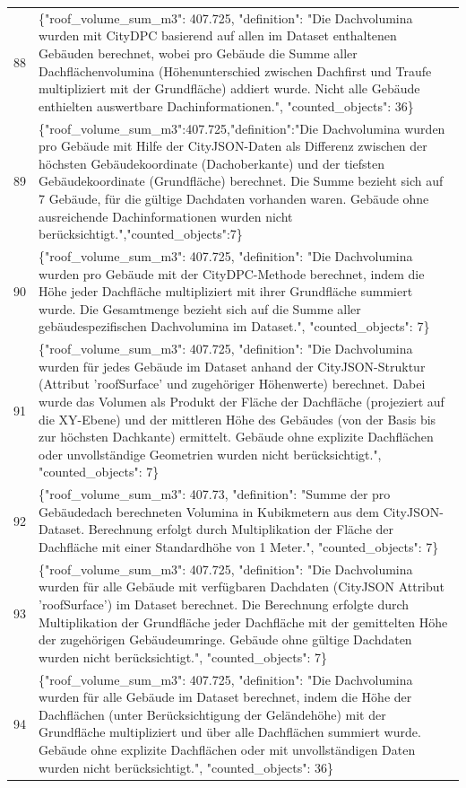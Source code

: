 \documentclass[a4paper,11pt]{article}
\begin{document}
\begin{table}[ht]
\begin{tabular}{r p{12cm}}
88 & \{"roof\_volume\_sum\_m3": 407.725, "definition": "Die Dachvolumina wurden mit CityDPC basierend auf allen im Dataset enthaltenen Gebäuden berechnet, wobei pro Gebäude die Summe aller Dachflächenvolumina (Höhenunterschied zwischen Dachfirst und Traufe multipliziert mit der Grundfläche) addiert wurde. Nicht alle Gebäude enthielten auswertbare Dachinformationen.", "counted\_objects": 36\} \\
89 & \{"roof\_volume\_sum\_m3":407.725,"definition":"Die Dachvolumina wurden pro Gebäude mit Hilfe der CityJSON-Daten als Differenz zwischen der höchsten Gebäudekoordinate (Dachoberkante) und der tiefsten Gebäudekoordinate (Grundfläche) berechnet. Die Summe bezieht sich auf 7 Gebäude, für die gültige Dachdaten vorhanden waren. Gebäude ohne ausreichende Dachinformationen wurden nicht berücksichtigt.","counted\_objects":7\} \\
90 & \{"roof\_volume\_sum\_m3": 407.725, "definition": "Die Dachvolumina wurden pro Gebäude mit der CityDPC-Methode berechnet, indem die Höhe jeder Dachfläche multipliziert mit ihrer Grundfläche summiert wurde. Die Gesamtmenge bezieht sich auf die Summe aller gebäudespezifischen Dachvolumina im Dataset.", "counted\_objects": 7\} \\
91 & \{"roof\_volume\_sum\_m3": 407.725, "definition": "Die Dachvolumina wurden für jedes Gebäude im Dataset anhand der CityJSON-Struktur (Attribut 'roofSurface' und zugehöriger Höhenwerte) berechnet. Dabei wurde das Volumen als Produkt der Fläche der Dachfläche (projeziert auf die XY-Ebene) und der mittleren Höhe des Gebäudes (von der Basis bis zur höchsten Dachkante) ermittelt. Gebäude ohne explizite Dachflächen oder unvollständige Geometrien wurden nicht berücksichtigt.", "counted\_objects": 7\} \\
92 & \{"roof\_volume\_sum\_m3": 407.73, "definition": "Summe der pro Gebäudedach berechneten Volumina in Kubikmetern aus dem CityJSON-Dataset. Berechnung erfolgt durch Multiplikation der Fläche der Dachfläche mit einer Standardhöhe von 1 Meter.", "counted\_objects": 7\} \\
93 & \{"roof\_volume\_sum\_m3": 407.725, "definition": "Die Dachvolumina wurden für alle Gebäude mit verfügbaren Dachdaten (CityJSON Attribut 'roofSurface') im Dataset berechnet. Die Berechnung erfolgte durch Multiplikation der Grundfläche jeder Dachfläche mit der gemittelten Höhe der zugehörigen Gebäudeumringe. Gebäude ohne gültige Dachdaten wurden nicht berücksichtigt.", "counted\_objects": 7\} \\
94 & \{"roof\_volume\_sum\_m3": 407.725, "definition": "Die Dachvolumina wurden für alle Gebäude im Dataset berechnet, indem die Höhe der Dachflächen (unter Berücksichtigung der Geländehöhe) mit der Grundfläche multipliziert und über alle Dachflächen summiert wurde. Gebäude ohne explizite Dachflächen oder mit unvollständigen Daten wurden nicht berücksichtigt.", "counted\_objects": 36\} \\

\end{tabular}
\end{table}
\end{document}
